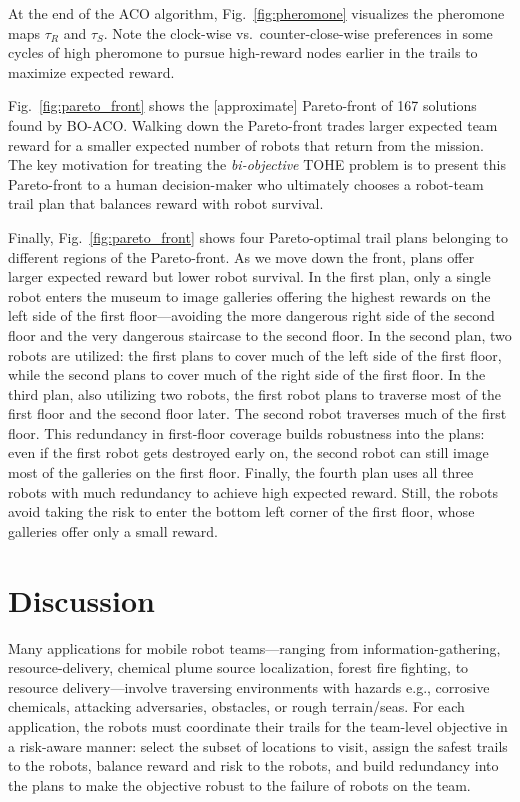 \documentclass[fleqn,10pt,lineno]{wlpeerj}
\begin{document}
At the end of the ACO algorithm, Fig.~\ref{fig:pheromone} visualizes the pheromone maps $\tau_{R}$ and $\tau_S$.
 Note the clock-wise vs.\ counter-close-wise preferences in some cycles of high pheromone to pursue high-reward nodes earlier in the trails to maximize expected reward.
 
 

Fig.~\ref{fig:pareto_front} shows the [approximate] Pareto-front of 167 solutions found by BO-ACO. 
Walking down the Pareto-front trades larger expected team reward for a smaller expected number of robots that return from the mission. The key motivation for treating the \emph{bi-objective} TOHE problem is to present this Pareto-front to a human decision-maker who ultimately chooses a robot-team trail plan that balances reward with robot survival.

Finally, Fig.~\ref{fig:pareto_front} shows four Pareto-optimal trail plans belonging to different regions of the Pareto-front. 
As we move down the front, plans offer larger expected reward but lower robot survival.
In the first plan, only a single robot enters the museum to image galleries offering the highest rewards on the left side of the first floor---avoiding the more dangerous right side of the second floor and the very dangerous staircase to the second floor. 
In the second plan, two robots are utilized: the first plans to cover much of the left side of the first floor, while the second plans to cover much of the right side of the first floor.
In the third plan, also utilizing two robots, the first robot plans to traverse most of the first floor and the second floor later. The second robot traverses much of the first floor. This redundancy in first-floor coverage builds robustness into the plans: even if the first robot gets destroyed early on, the second robot can still image most of the galleries on the first floor.
Finally, the fourth plan uses all three robots with much redundancy to achieve high expected reward. Still, the robots avoid taking the risk to enter the bottom left corner of the first floor, whose galleries offer only a small reward.


\section{Discussion}
Many applications for mobile robot teams---ranging from information-gathering, resource-delivery, chemical plume source localization, forest fire fighting, to resource delivery---involve traversing environments with hazards e.g., corrosive chemicals, attacking adversaries, obstacles, or rough terrain/seas. 
For each application, the robots must coordinate their trails for the team-level objective in a risk-aware manner: select the subset of locations to visit, assign the safest trails to the robots, balance reward and risk to the robots, and build redundancy into the plans to make the objective robust to the failure of robots on the team. 
\end{document}
